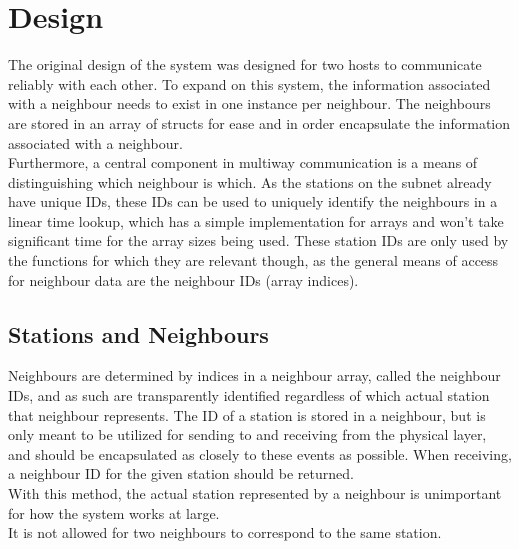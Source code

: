 \section{Design}


The original design of the system was designed for two hosts to communicate reliably with each other. To expand on this system, the information associated with a neighbour needs to exist in one instance per neighbour. The neighbours are stored in an array of structs for ease and in order encapsulate the information associated with a neighbour.\\
Furthermore, a central component in multiway communication is a means of distinguishing which neighbour is which. As the stations on the subnet already have unique IDs, these IDs can be used to uniquely identify the neighbours in a linear time lookup, which has a simple implementation for arrays and won't take significant time for the array sizes being used. These station IDs are only used by the functions for which they are relevant though, as the general means of access for neighbour data are the neighbour IDs (array indices).

\subsection{Stations and Neighbours}
Neighbours are determined by indices in a neighbour array, called the neighbour IDs, and as such are transparently identified regardless of which actual station that neighbour represents. The ID of a station is stored in a neighbour, but is only meant to be utilized for sending to and receiving from the physical layer, and should be encapsulated as closely to these events as possible. When receiving, a neighbour ID for the given station should be returned.\\
With this method, the actual station represented by a neighbour is unimportant for how the system works at large.\\
It is not allowed for two neighbours to correspond to the same station.

%


